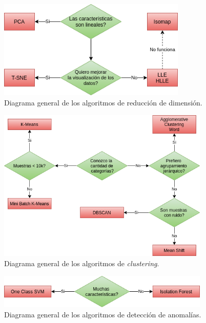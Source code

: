 \documentclass[a4paper,12pt]{article}
\begin{document}
\begin{figure}[H]
	\begin{center}				
	\includegraphics[width=0.8\textwidth]{dimreduxdiagram.png}
  	\caption{Diagrama general de los algoritmos de reducción de dimensión.}
  	\label{fig:dimreduxdiagram.}
  	\end{center}
\end{figure}

\begin{figure}[H]
	\begin{center}				
	\includegraphics[width=0.9\textwidth]{clusteringdiagram.png}
  	\caption{Diagrama general de los algoritmos de \textit{clustering}.}
  	\label{fig:clusteringdiagram.}
  	\end{center}
\end{figure}

\begin{figure}[H]
	\begin{center}				
	\includegraphics[width=0.9\textwidth]{anomalydiagram.png}
  	\caption{Diagrama general de los algoritmos de detección de anomalías.}
  	\label{fig:anomalydiagram.}
  	\end{center}
\end{figure}
\end{document}
